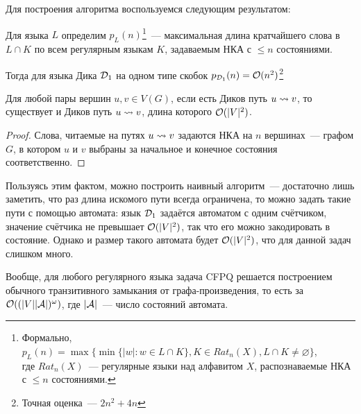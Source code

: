 Для построения алгоритма воспользуемся следующим результатом:

\begin{lemma}

  Для языка $L$ определим $p_L(n)$\footnote{Формально, $p_L(n) = \max \{ \min \{|w| \colon w \in L \cap K \}, K \in Rat_n(X), L \cap K \ne \varnothing \}$,\\ где $Rat_n(X)$~--- регулярные языки над алфавитом $X$, распознаваемые НКА с $\le n$ состояниями.}~--- максимальная длина кратчайшего слова в $L \cap K$ по всем регулярным языкам $K$, задаваемым НКА с $\le n$ состояниями.

  Тогда для языка Дика $\mathcal{D}_1$ на одном типе скобок $p_{\mathcal{D}_1}(n) = \mathcal{O}(n^2)$\footnote{Точная оценка~--- $2n^2 + 4n$}
\end{lemma}

\begin{corollary}
  Для любой пары вершин $u, v \in V(G)$, если есть Диков путь $u \rightsquigarrow v$, то существует и Диков путь $u \rightsquigarrow v$, длина которого $\mathcal{O}(|V|^2)$.
\end{corollary}
\begin{proof}
  Слова, читаемые на путях $u \rightsquigarrow v$ задаются НКА на $n$ вершинах~--- графом $G$, в котором $u$ и $v$ выбраны за начальное и конечное состояния соответственно.
\end{proof}

\begin{note}
  Пользуясь этим фактом, можно построить наивный алгоритм~--- достаточно лишь заметить, что раз длина искомого пути всегда ограничена, то можно задать такие пути с помощью автомата: язык $\mathcal{D}_1$ задаётся автоматом с одним счётчиком, значение счётчика не превышает $\mathcal{O}(|V|^2)$, так что его можно закодировать в состояние. Однако и размер такого автомата будет $\mathcal{O}(|V|^2)$, что для данной задач слишком много.
\end{note} 

\begin{note}\label{fact:regular_cfpq}
  Вообще, для любого регулярного языка задача CFPQ решается построением обычного транзитивного замыкания от графа-произведения, то есть за $\mathcal{O}((|V| |\mathcal{A}|)^{\omega})$, где $|\mathcal{A}|$~--- число состояний автомата.
\end{note}



